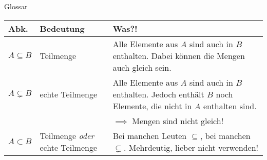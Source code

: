 %
%
%
%

\begin{frame}[fragile]{Glossar}
	\small
	\begin{tabular}{p{} p{} p{}}
		\toprule
		Abk.&Bedeutung&Was?!\\
		\midrule
		$A \subseteq B$ & Teilmenge & Alle Elemente aus $A$ sind auch in $B$ enthalten. Dabei können die Mengen auch gleich sein.\\
		$A \subsetneq B$ & echte Teilmenge & Alle Elemente aus $A$ sind auch in $B$ enthalten. Jedoch enthält $B$ noch Elemente, die nicht in $A$ enthalten sind.
		\\&&$\implies$ Mengen sind nicht gleich!\\
		$A \subset B$ & Teilmenge \emph{oder} echte Teilmenge & Bei manchen Leuten $\subseteq$, bei manchen $\subsetneq$. Mehrdeutig, lieber nicht verwenden!\\
		\bottomrule
	\end{tabular}
\end{frame}